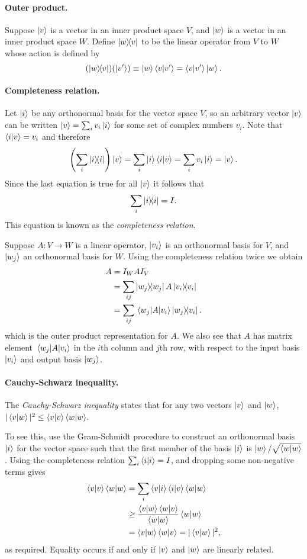 \documentclass{article}
\numberwithin{theorem}{section}
\numberwithin{corollary}{section}
\begin{document}
\paragraph{Outer product.} Suppose $\ket{v}$ is a vector in an inner product
space $V$, and $\ket{w}$ is a vector in an inner product space $W$. Define
$\op{w}{v}$ to be the linear operator from $V$ to $W$ whose action is defined
by \[
  (\op{w}{v})(\ket{v'}) \equiv \ket{w}\ip{v}{v'} = \ip{v}{v'}\ket{w}.
\]

\paragraph{Completeness relation.} Let $\ket{i}$ be any orthonormal basis for
the vector space $V$, so an arbitrary vector $\ket{v}$ can be written $\ket{v}
= \sum_i v_i\ket{i}$ for some set of complex numbers $v_i$. Note that
$\ip{i}{v} = v_i$ and therefore \[
  \left(\sum_i \op{i}{i}\right)\ket{v} = \sum_i \ket{i}\ip{i}{v} =
  \sum_i v_i\ket{i} = \ket{v}.
\] Since the last equation is true for all $\ket{v}$ it follows that \[
  \sum_i \op{i}{i} = I.
\]
This equation is known as the \emph{completeness relation}.

Suppose $A: V \to W$ is a linear operator, $\ket{v_i}$ is an orthonormal basis
for $V$, and $\ket{w_j}$ an orthonormal basis for $W$. Using the completeness
relation twice we obtain
\begin{align*}
  A &= I_WAI_V \\
    &= \sum_{ij} \op{w_j}{w_j}A\op{v_i}{v_i} \\
    &= \sum_{ij} \mel{w_j}{A}{v_i}\op{w_j}{v_i}.
\end{align*}
which is the outer product representation for $A$. We also see that $A$ has
matrix element $\mel{w_j}{A}{v_i}$ in the $i$th column and $j$th row, with
respect to the input basis $\ket{v_i}$ and output basis $\ket{w_j}$.

\paragraph{Cauchy-Schwarz inequality.} The \emph{Cauchy-Schwarz inequality}
states that for any two vectors $\ket{v}$ and $\ket{w}$, $|\ip{v}{w}|^2 \leq
\ip{v}{v}\ip{w}{w}$.

To see this, use the Gram-Schmidt procedure to construct an orthonormal basis
$\ket{i}$ for the vector space such that the first member of the basis
$\ket{i}$ is $\ket{w}/\sqrt{\ip{w}{w}}$. Using the completeness relation
$\sum_i \ip{i}{i} = I$, and dropping some non-negative terms gives
\begin{align*}
  \ip{v}{v}\ip{w}{w}
  &= \sum_i \ip{v}{i}\ip{i}{v}\ip{w}{w} \\
  &\geq \frac{\ip{v}{w}\ip{w}{v}}{\ip{w}{w}}\ip{w}{w} \\
  &= \ip{v}{w}\ip{w}{v} = |\ip{v}{w}|^2,
\end{align*}
as required. Equality occurs if and only if $\ket{v}$ and $\ket{w}$ are
linearly related.
\end{document}

